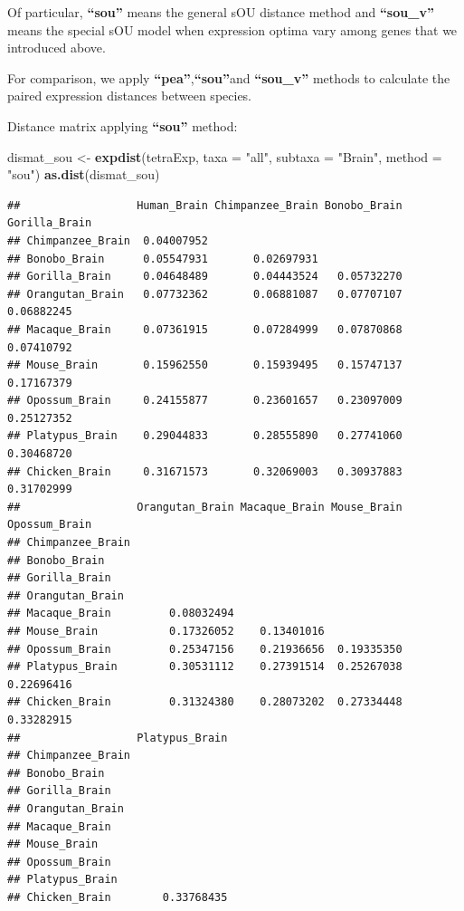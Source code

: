 \documentclass[]{book}
\newenvironment{Shaded}{\begin{snugshade}}{\end{snugshade}}
\newcommand{\DataTypeTok}[1]{\textcolor[rgb]{0.13,0.29,0.53}{#1}}
\newcommand{\KeywordTok}[1]{\textcolor[rgb]{0.13,0.29,0.53}{\textbf{#1}}}
\newcommand{\NormalTok}[1]{#1}
\newcommand{\StringTok}[1]{\textcolor[rgb]{0.31,0.60,0.02}{#1}}
\begin{document}
Of particular, \textbf{``sou''} means the general sOU distance method and \textbf{``sou\_v''} means the special sOU model when expression optima vary among genes that we introduced above.

For comparison, we apply \textbf{``pea''},\textbf{``sou''}and \textbf{``sou\_v''} methods to calculate the paired expression distances between species.

Distance matrix applying \textbf{``sou''} method:

\begin{Shaded}
\begin{Highlighting}[]
\NormalTok{dismat_sou <-}\StringTok{ }\KeywordTok{expdist}\NormalTok{(tetraExp, }\DataTypeTok{taxa =} \StringTok{"all"}\NormalTok{,}
                 \DataTypeTok{subtaxa =} \StringTok{"Brain"}\NormalTok{,}
                 \DataTypeTok{method =} \StringTok{"sou"}\NormalTok{)}
\KeywordTok{as.dist}\NormalTok{(dismat_sou)}
\end{Highlighting}
\end{Shaded}

\begin{verbatim}
##                  Human_Brain Chimpanzee_Brain Bonobo_Brain Gorilla_Brain
## Chimpanzee_Brain  0.04007952                                            
## Bonobo_Brain      0.05547931       0.02697931                           
## Gorilla_Brain     0.04648489       0.04443524   0.05732270              
## Orangutan_Brain   0.07732362       0.06881087   0.07707107    0.06882245
## Macaque_Brain     0.07361915       0.07284999   0.07870868    0.07410792
## Mouse_Brain       0.15962550       0.15939495   0.15747137    0.17167379
## Opossum_Brain     0.24155877       0.23601657   0.23097009    0.25127352
## Platypus_Brain    0.29044833       0.28555890   0.27741060    0.30468720
## Chicken_Brain     0.31671573       0.32069003   0.30937883    0.31702999
##                  Orangutan_Brain Macaque_Brain Mouse_Brain Opossum_Brain
## Chimpanzee_Brain                                                        
## Bonobo_Brain                                                            
## Gorilla_Brain                                                           
## Orangutan_Brain                                                         
## Macaque_Brain         0.08032494                                        
## Mouse_Brain           0.17326052    0.13401016                          
## Opossum_Brain         0.25347156    0.21936656  0.19335350              
## Platypus_Brain        0.30531112    0.27391514  0.25267038    0.22696416
## Chicken_Brain         0.31324380    0.28073202  0.27334448    0.33282915
##                  Platypus_Brain
## Chimpanzee_Brain               
## Bonobo_Brain                   
## Gorilla_Brain                  
## Orangutan_Brain                
## Macaque_Brain                  
## Mouse_Brain                    
## Opossum_Brain                  
## Platypus_Brain                 
## Chicken_Brain        0.33768435
\end{verbatim}
\end{document}
